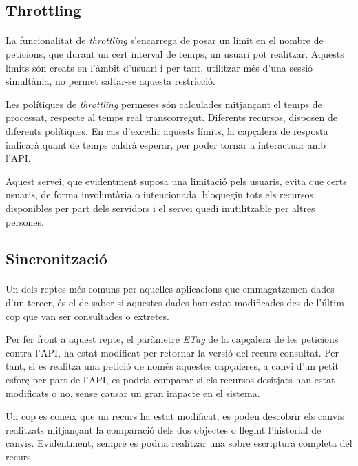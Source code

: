     \subsection{Throttling}

        \paragraph{}
        La funcionalitat de \emph{throttling} s'encarrega de posar un límit en el nombre de peticions, que durant un cert interval de temps, un usuari pot realitzar. Aquests límits són creats en l'àmbit d'usuari i per tant, utilitzar més d'una sessió simultània, no permet saltar-se aquesta restricció.

        Les polítiques de \emph{throttling} permeses són calculades mitjançant el temps de processat, respecte al temps real transcorregut. Diferents recursos, disposen de diferents polítiques. En cas d'excedir aquests límits, la capçalera de resposta indicarà quant de temps caldrà esperar, per poder tornar a interactuar amb l'API.

        Aquest servei, que evidentment suposa una limitació pels usuaris, evita que certs usuaris, de forma involuntària o intencionada, bloquegin tots els recursos disponibles per part dels servidors i el servei quedi inutilitzable per altres persones.


    \subsection{Sincronització}

        \paragraph{}
        Un dels reptes més comuns per aquelles aplicacions que emmagatzemen dades d'un tercer, és el de saber si aquestes dades han estat modificades des de l'últim cop que van ser consultades o extretes.

        Per fer front a aquest repte, el paràmetre \emph{ETag} de la capçalera de les peticions contra l'API, ha estat modificat per retornar la versió del recurs consultat. Per tant, si es realitza una petició de només aquestes capçaleres, a canvi d'un petit esforç per part de l'API, es podria comparar si els recursos desitjats han estat modificats o no, sense causar un gran impacte en el sistema.

        Un cop es coneix que un recurs ha estat modificat, es poden descobrir els canvis realitzats mitjançant la comparació dels dos objectes o llegint l'historial de canvis. Evidentment, sempre es podria realitzar una sobre escriptura completa del recurs.


